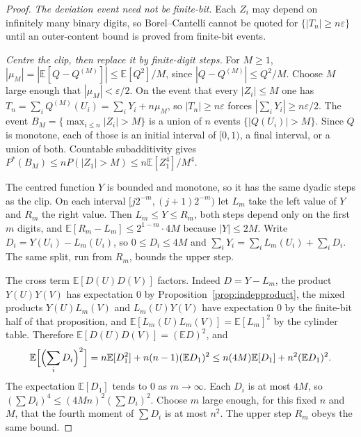 \begin{proof}
\emph{The deviation event need not be finite-bit.} Each $Z_i$ may depend on infinitely many binary digits, so Borel--Cantelli cannot be quoted for $\{|T_n|\ge n\varepsilon\}$ until an outer-content bound is proved from finite-bit events.

\emph{Centre the clip, then replace it by finite-digit steps.} For $M\ge1$, $|\mu_M|=|\mathbb E[Q-Q^{(M)}]|\le\mathbb E[Q^2]/M$, since $|Q-Q^{(M)}|\le Q^2/M$. Choose $M$ large enough that $|\mu_M|<\varepsilon/2$. On the event that every $|Z_i|\le M$ one has $T_n=\sum_i Q^{(M)}(U_i)=\sum_i Y_i+n\mu_M$, so $|T_n|\ge n\varepsilon$ forces $|\sum_i Y_i|\ge n\varepsilon/2$. The event $B_M=\{\max_{i\le n}|Z_i|>M\}$ is a union of $n$ events $\{|Q(U_i)|>M\}$. Since $Q$ is monotone, each of those is an initial interval of $[0,1)$, a final interval, or a union of both. Countable subadditivity gives $P^*(B_M)\le n P(|Z_1|>M)\le n\mathbb E[Z_1^4]/M^4$.

The centred function $Y$ is bounded and monotone, so it has the same dyadic steps as the clip. On each interval $[j2^{-m},(j+1)2^{-m})$ let $L_m$ take the left value of $Y$ and $R_m$ the right value. Then $L_m\le Y\le R_m$, both steps depend only on the first $m$ digits, and $\mathbb E[R_m-L_m]\le2^{1-m}\cdot4M$ because $|Y|\le2M$. Write $D_i=Y(U_i)-L_m(U_i)$, so $0\le D_i\le4M$ and $\sum_i Y_i=\sum_i L_m(U_i)+\sum_i D_i$. The same split, run from $R_m$, bounds the upper step.

The cross term $\mathbb E[D(U)D(V)]$ factors. Indeed $D=Y-L_m$, the product $Y(U)Y(V)$ has expectation $0$ by Proposition~\ref{prop:indepproduct}, the mixed products $Y(U)L_m(V)$ and $L_m(U)Y(V)$ have expectation $0$ by the finite-bit half of that proposition, and $\mathbb E[L_m(U)L_m(V)]=\mathbb E[L_m]^2$ by the cylinder table. Therefore $\mathbb E[D(U)D(V)]=(\mathbb E D)^2$, and
\[
 \mathbb E\Bigl[\Bigl(\sum_i D_i\Bigr)^2\Bigr]
 =n\mathbb E[D_1^2]+n(n-1)(\mathbb E D_1)^2
 \le n(4M)\mathbb E[D_1]+n^2(\mathbb E D_1)^2.
\]
The expectation $\mathbb E[D_1]$ tends to $0$ as $m\to\infty$. Each $D_i$ is at most $4M$, so $(\sum D_i)^4\le(4Mn)^2(\sum D_i)^2$. Choose $m$ large enough, for this fixed $n$ and $M$, that the fourth moment of $\sum D_i$ is at most $n^2$. The upper step $R_m$ obeys the same bound.


\end{proof}

